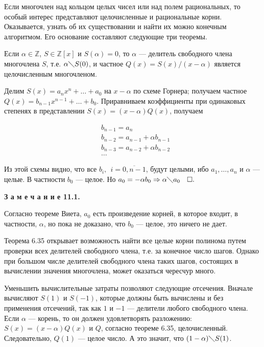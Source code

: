 \documentclass{article}
\begin{document}
Если многочлен над кольцом целых чисел или над полем рациональных, то особый
интерес представляют целочисленные и рациональные корни. Оказывается, узнать об
их существовании и найти их можно конечным алгоритмом. Его основание составляют
следующие три теоремы.

\theorem[6.35]

Если $\alpha\in\mathbb{Z}$, $S\in\mathbb{Z} [x]$ и $S(\alpha )=0$, то $\alpha $ --- делитель свободного члена многочлена $S$, т.е.
$\alpha\diagdown S(0)$, и частное $Q(x)=S(x)/(x-\alpha )$ является целочисленным многочленом.

\proof

Делим $S(x)=a_n x^n+\ldots +a_0$ на $x-\alpha $ по схеме Горнера; получаем частное $Q(x)=b_{n-1} x^{n-1}+\ldots +b_0$.
Приравниваем коэффициенты при одинаковых степенях в представлении $S(x)=(x-\alpha )Q(x)$, получаем

\begin{align*}
	 & b_{n-1}=a_n                    \\
	 & b_{n-2}=a_{n-1}+\alpha b_{n-1} \\
	 & b_{n-3}=a_{n-2}+\alpha b_{n-2} \\
	 & \ldots
\end{align*}

Из этой схемы видно, что все $b_i,~~i=\overline{0, n-1}$, будут целыми, ибо $a_1,\ldots , a_n$ и $\alpha $ --- целые.
В частности $b_0$ --- целое. Но $a_0 = -\alpha b_0 \Rightarrow \alpha\diagdown a_0~~\;\square.$ \newline

\textbf{З а м е ч а н и е 11.1.} \newline

Согласно теореме Виета, $a_0$ есть произведение корней, в которое входит, в частности, $\alpha $, но пока не доказано, что $b_0$ --- целое, это ничего не дает. \newline

Теорема 6.35 открывает возможность найти все целые корни полинома путем проверки всех делителей свободного члена, т.е. за конечное число шагов. Однако при большом
числе делителей свободного члена таких шагов, состоящих в вычислении значения многочлена, может оказаться чересчур много.

Уменьшить вычислительные затраты позволяют следующие отсечения. Вначале вычисляют $S(1)$ и $S(-1)$, которые должны быть вычислены и без применения отсечений,
так как $1$ и $-1$ --- делители любого свободного члена. Если $\alpha $ --- корень, то он должен удовлетворять разложению: $S(x) = (x-\alpha )Q(x)$ и $Q$, согласно теореме 6.35, целочисленный.
Следовательно, $Q(1)$ --- целое число. А это значит, что $(1-\alpha)\diagdown S(1)$.
\end{document}
